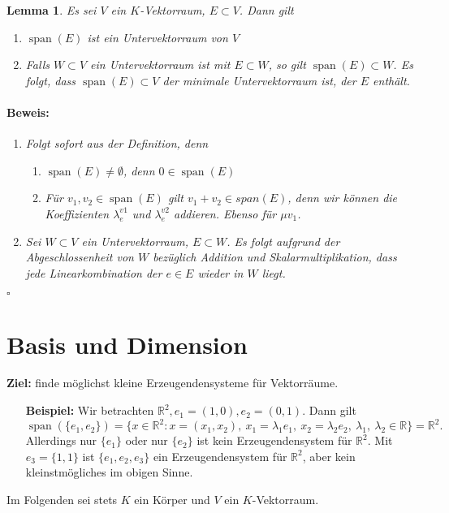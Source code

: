 \documentclass{report}
\newcommand{\lb}{\lambda}
\newcommand{\R}{\mathbb{R}}
\DeclareMathOperator{\Span}{span}
\theoremstyle{customrem}
\theoremstyle{customdef}
\newtheorem{lem}[definition]{Lemma}
\renewenvironment{proof}{\vspace{-.75cm}\paragraph{Beweis: }}{\vspace{-.5cm}\hfill$\square$}
\begin{document}
	\begin{lem}
		Es sei $V$ ein $K$-Vektorraum, $E \subset V$. Dann gilt
		\begin{enumerate}
			\item $\Span(E)$ ist ein Untervektorraum von $V$
			\item Falls $W \subset V$ ein Untervektorraum ist mit $E \subset W$, so gilt $\Span(E) \subset W$. Es folgt, dass $\Span(E) \subset V$ der minimale Untervektorraum ist, der $E$ enthält.
		\end{enumerate}
		\vspace{.2cm}
		\begin{proof}
			\begin{enumerate}
				\item Folgt sofort aus der Definition, denn 
				\begin{enumerate}
					\item $\Span(E) \neq \emptyset$, denn $0 \in \Span(E)$
					\item Für $v_1, v_2 \in \Span(E)$ gilt $v_1 + v_2 \in span(E)$, denn wir können die Koeffizienten $\lb_e^{v1}$ und $\lb_e^{v2}$ addieren. Ebenso für $\mu v_1$.
				\end{enumerate}
				\item Sei $W \subset V$ ein Untervektorraum, $E \subset W$. Es folgt aufgrund der Abgeschlossenheit von $W$ bezüglich Addition und Skalarmultiplikation, dass jede Linearkombination der $e \in E$ wieder in $W$ liegt.
			\end{enumerate}
		\end{proof}
	\end{lem}
	
\section{Basis und Dimension}
	\hspace{-.25cm}\textbf{Ziel:} finde möglichst kleine Erzeugendensysteme für Vektorräume.
	\begin{enumerate}[leftmargin=1.4cm]
		\item[\textbf{Beispiel:}]Wir betrachten $\R^2, e_1=(1, 0), e_2 = (0,1)$. Dann gilt $$\Span(\{e_1, e_2\})
		= \{x \in \R^2 : x = (x_1, x_2),\ x_1 = \lb_1 e_1,\ x_2 = \lb_2 e_2,\ \lb_1,\ \lb_2 \in \R\} = \R^2.$$ 
		Allerdings nur $\{e_1\}$ oder nur $\{e_2\}$ ist kein Erzeugendensystem für $\R^2$. Mit $e_3 = \{1, 1\}$ ist $\{e_1, e_2, e_3\}$ ein Erzeugendensystem für $\R^2$, aber kein kleinstmögliches im obigen Sinne.
	\end{enumerate}
	\hspace{-.25cm}Im Folgenden sei stets $K$ ein Körper und $V$ ein $K$-Vektorraum.
	
\end{document}
